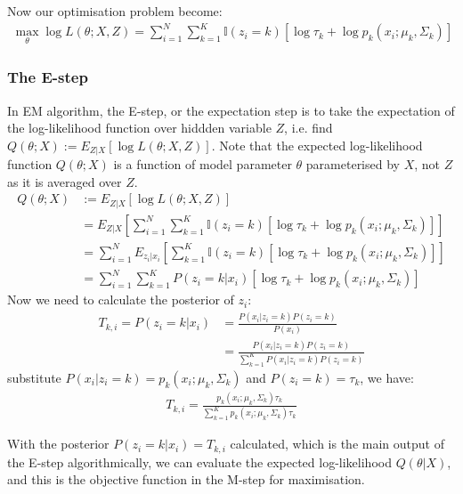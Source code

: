 \documentclass{article} [10pt] %
\begin{document}
Now our optimisation problem become:
\begin{align}
	\max_{\theta}\log L(\theta;X, Z)= \sum_{i=1}^N \sum_{k=1}^K \mathbb{I}(z_i=k)\left[\log\tau_k + \log p_k(x_i; \mu_k, \Sigma_k)\right]
\end{align}

\subsubsection{The E-step}
In EM algorithm, the E-step, or the expectation step is to take the expectation of the log-likelihood function over hiddden variable $Z$, i.e. find $Q(\theta; X):=E_{Z|X}[\log L(\theta;X, Z)]$. Note that the expected log-likelihood function $Q(\theta;X)$ is a function of model parameter $\theta$ parameterised by $X$, not $Z$ as it is averaged over $Z$.
\begin{align}
	Q(\theta;X)&:=E_{Z|X}[\log L(\theta;X, Z)]\\
	&=E_{Z|X}\left[\sum_{i=1}^N \sum_{k=1}^K\mathbb{I}(z_i=k)\left[\log\tau_k + \log p_k(x_i; \mu_k, \Sigma_k)\right]\right]\\
	&=\sum_{i=1}^N E_{z_i|x_i} \left[\sum_{k=1}^K\mathbb{I}(z_i=k)\left[\log\tau_k + \log p_k(x_i; \mu_k, \Sigma_k)\right] \right]\\
	&=\sum_{i=1}^N \sum_{k=1}^K P(z_i=k|x_i)\left[\log\tau_k + \log p_k(x_i; \mu_k, \Sigma_k)\right]
\end{align}
Now we need to calculate the posterior of $z_i$:
\begin{align}
	T_{k, i}=P(z_i=k|x_i) &= \frac{P(x_i|z_i=k )P(z_i=k) }{P(x_i)}\\
	&=\frac{P(x_i|z_i=k )P(z_i=k) }{\sum_{k=1}^KP(x_i|z_i=k)P(z_i=k)}
\end{align}
substitute $P(x_i|z_i=k )=p_k(x_i;\mu_k,\Sigma_k)$ and $P(z_i=k)=\tau_k$, we have:
\begin{align}\label{eq:expectation_T}
\boxed{
	T_{k, i}=\frac{p_k(x_i;\mu_k,\Sigma_k)\tau_k}{\sum_{k=1}^Kp_k(x_i;\mu_k,\Sigma_k)\tau_k}
}
\end{align}

With the posterior $P(z_i=k|x_i)=T_{k, i}$ calculated, which is the main output of the E-step algorithmically, we can evaluate the expected log-likelihood $Q(\theta|X)$, and this is the objective function in the M-step for maximisation.
\end{document}
